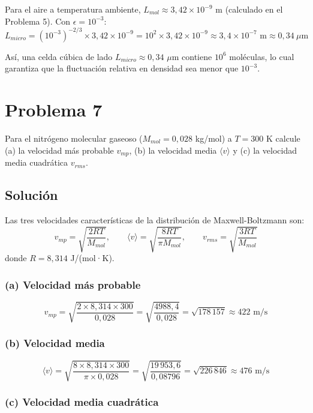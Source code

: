 \documentclass[a4paper]{article}
\begin{document}
Para el aire a temperatura ambiente, $L_{mol} \approx 3{,}42 \times 10^{-9}$ m (calculado en el Problema 5). Con $\epsilon = 10^{-3}$:
$$
L_{micro} = (10^{-3})^{-2/3} \times 3{,}42 \times 10^{-9} = 10^2 \times 3{,}42 \times 10^{-9} \approx 3{,}4 \times 10^{-7} \text{ m} \approx 0{,}34 \ \mu\text{m}
$$

Así, una celda cúbica de lado $L_{micro} \approx 0{,}34$ $\mu$m contiene $10^6$ moléculas, lo cual garantiza que la fluctuación relativa en densidad sea menor que $10^{-3}$.

\section{Problema 7}
Para el nitrógeno molecular gaseoso ($M_{mol} = 0{,}028$ kg/mol) a $T = 300$ K calcule (a) la velocidad más probable $v_{mp}$, (b) la velocidad media $\langle v \rangle$ y (c) la velocidad media cuadrática $v_{rms}$.

\subsection{Solución}

Las tres velocidades características de la distribución de Maxwell-Boltzmann son:
$$
v_{mp} = \sqrt{\frac{2RT}{M_{mol}}}, \qquad \langle v \rangle = \sqrt{\frac{8RT}{\pi M_{mol}}}, \qquad v_{rms} = \sqrt{\frac{3RT}{M_{mol}}}
$$
donde $R = 8{,}314$ J/(mol·K).

\subsubsection{(a) Velocidad más probable}

$$
v_{mp} = \sqrt{\frac{2 \times 8{,}314 \times 300}{0{,}028}} = \sqrt{\frac{4988{,}4}{0{,}028}} = \sqrt{178\,157} \approx 422 \text{ m/s}
$$

\subsubsection{(b) Velocidad media}

$$
\langle v \rangle = \sqrt{\frac{8 \times 8{,}314 \times 300}{\pi \times 0{,}028}} = \sqrt{\frac{19\,953{,}6}{0{,}08796}} = \sqrt{226\,846} \approx 476 \text{ m/s}
$$

\subsubsection{(c) Velocidad media cuadrática}
\end{document}
